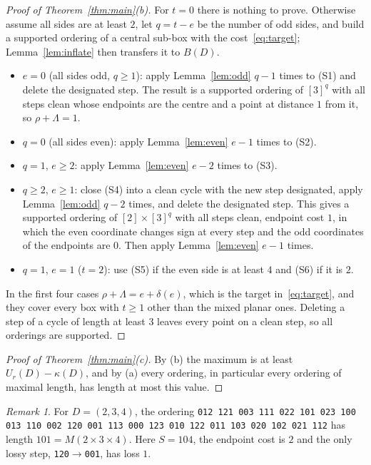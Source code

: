 \documentclass[11pt]{article}
\theoremstyle{remark}
\newtheorem{remark}{Remark}
\begin{document}
\begin{proof}[Proof of Theorem~\ref{thm:main}(b)]
For $t=0$ there is nothing to prove. Otherwise assume all sides are at least
$2$, let $q=t-e$ be the number of odd sides, and build a supported ordering of
a central sub-box with the cost~\eqref{eq:target}; Lemma~\ref{lem:inflate}
then transfers it to $B(D)$.
\begin{itemize}
\item $e=0$ (all sides odd, $q\ge1$): apply Lemma~\ref{lem:odd} $q-1$ times to
(S1) and delete the designated step. The result is a supported ordering of
$[3]^q$ with all steps clean whose endpoints are the centre and a point at
distance $1$ from it, so $\rho+\Lambda=1$.
\item $q=0$ (all sides even): apply Lemma~\ref{lem:even} $e-1$ times to (S2).
\item $q=1$, $e\ge2$: apply Lemma~\ref{lem:even} $e-2$ times to (S3).
\item $q\ge2$, $e\ge1$: close (S4) into a clean cycle with the new step
designated, apply Lemma~\ref{lem:odd} $q-2$ times, and delete the designated
step. This gives a supported ordering of $[2]\times[3]^q$ with all steps
clean, endpoint cost $1$, in which the even coordinate changes sign at every
step and the odd coordinates of the endpoints are $0$. Then apply
Lemma~\ref{lem:even} $e-1$ times.
\item $q=1$, $e=1$ ($t=2$): use (S5) if the even side is at least $4$ and (S6)
if it is $2$.
\end{itemize}
In the first four cases $\rho+\Lambda=e+\delta(e)$, which is the target
in~\eqref{eq:target}, and they cover every box with $t\ge1$ other than the
mixed planar ones. Deleting a step of a cycle of length at least $3$ leaves
every point on a clean step, so all orderings are supported.
\end{proof}

\begin{proof}[Proof of Theorem~\ref{thm:main}(c)]
By (b) the maximum is at least $U_r(D)-\kappa(D)$, and by (a) every ordering,
in particular every ordering of maximal length, has length at most this value.
\end{proof}

\begin{remark}\label{rem:234}
For $D=(2,3,4)$, the ordering
\texttt{012 121 003 111 022 101 023 100 013 110 002 120 001 113 000 123 010 122
011 103 020 102 021 112} has length $101=M(2\times3\times4)$. Here
$S=104$, the endpoint cost is $2$ and the only lossy step,
\texttt{120}$\to$\texttt{001}, has loss $1$.
\end{remark}
\end{document}
